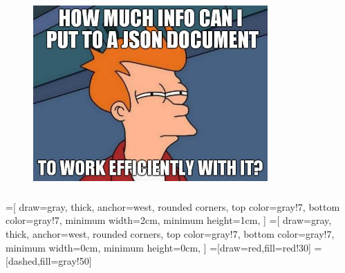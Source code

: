 \documentclass[usenames,dvipsnames, 18pt, compress, aspectratio=169]{beamer}
\begin{document}
\fontsize{17pt}{19}\selectfont
\begin{frame}
    \frametitle{}
    \begin{center}

    \begin{figure}
        \includegraphics[width=0.8\textwidth,center]{fry_disk_json.jpg}
    \end{figure}

    \end{center}
\end{frame}

\fontsize{14pt}{16}\selectfont
\begin{frame}
    \frametitle{}
    \begin{center}
    =[
        draw=gray,
        thick,
        anchor=west,
        rounded corners,
        top color=gray!7,
        bottom color=gray!7,
        minimum width=2cm,
        minimum height=1cm,
    ]
    =[
        draw=gray,
        thick,
        anchor=west,
        rounded corners,
        top color=gray!7,
        bottom color=gray!7,
        minimum width=0cm,
        minimum height=0cm,
    ]
    =[draw=red,fill=red!30]
    =[dashed,fill=gray!50]

    \end{center}
\end{frame}
\end{document}
